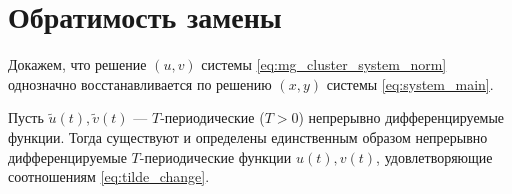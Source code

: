 \section{Обратимость замены}\label{sec:ch3/sect2}

Докажем, что решение $(u, v)$ системы \eqref{eq:mg_cluster_system_norm} однозначно восстанавливается по решению $(x, y)$ системы \eqref{eq:system_main}.

\begin{lemma}
	\label{lm:uv_from_tilde}
	Пусть $\tilde{u}(t), \tilde{v}(t)$ --- $T$-периодические ($T > 0$) непрерывно дифференцируемые функции. Тогда существуют и определены единственным образом непрерывно дифференцируемые $T$-периодические функции $u(t), v(t)$, удовлетворяющие соотношениям \eqref{eq:tilde_change}.
\end{lemma}
